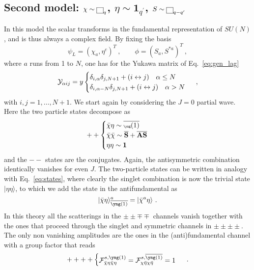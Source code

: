 \documentclass[a4paper,11pt]{article}
\newcommand{\be}{\begin{equation}}
\newcommand{\ee}{\end{equation}}
\newcommand{\nn}{\nonumber}
\begin{document}

\subsection{Second model: $\chi\sim {\tiny{\fbox{$\protect\phantom s$} }}_q$, $\eta\sim \mathbf{1}_{q^\prime}$, $S\sim {\tiny{\fbox{$\protect\phantom s$} }}_{q-q^\prime}$  }\label{sec:model2}

In this  model the scalar transforms in the fundamental representation of $SU(N)$, and is thus always a complex field.  By fixing the basis
\be
\psi_L = (\chi_{a}, \eta^{c})^T \ , \qquad \phi= (S_a, S^{*a})^T \ ,
\ee
where $a$ runs from 1 to $N$, one has for the Yukawa matrix of Eq.~\eqref{eq:gen_lag}
\be
{\cal Y}_{\alpha i j} = 
y
\begin{cases}
\delta_{i,\alpha}\delta_{j,N+1} + (i \leftrightarrow j) \quad \alpha \le N\\
 \delta_{i,\alpha-N}\delta_{j,N+1} + (i \leftrightarrow j) \quad \alpha > N\\ 
\end{cases} \ ,
\ee
with $i,j=1,\dots,N+1$.
We start again by considering the $J=0$ partial wave. Here the two particle states decompose as
\be
++
\begin{cases}
 \bar\chi \eta  \sim  {\overline{{\tiny{\yng(1)}}}}\nn \\
 \bar\chi \bar \chi \sim  {\overline{{\rm{\bf S}}}}+{\overline{{\rm{\bf AS}}}} \\
 \eta \eta \sim {\bf 1}
\end{cases} \qquad
%
\ee 
and the $--$ states are the conjugates. Again, the antisymmetric combination identically vanishes for even $J$. The two-particle states can be written in analogy with Eq.~\eqref{eq:states}, where clearly the singlet combination is now the trivial state $|\eta \eta \rangle$, to which we add the state in the antifundamental as
\be
|\bar \chi \eta \rangle^a_{{\overline{{\tiny{\yng(1)}}}}} = | \bar\chi^a \eta  \rangle \ .
\ee
In this theory all the scatterings in the $\pm\pm \mp \mp$ channels vanish together with the ones that proceed through the singlet and symmetric channels in $\pm\pm\pm\pm$. The only non vanishing amplitudes are the ones in the (anti)fundamental channel with a group factor that reads
\begin{align}\label{eq:group_model2_J0}
++++
\begin{cases}
{\cal F}^{s,{\tiny{\yng(1)}}}_{\bar \chi \eta \bar \chi \eta}  = {\cal F}^{s,{{\overline{\tiny{\yng(1)}}}}}_{ \chi \bar\eta  \chi \bar\eta}= 1
\end{cases} \ .
\end{align}
\end{document}
